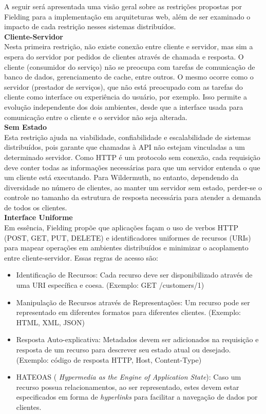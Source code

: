 A seguir será apresentada uma visão geral sobre as restrições propostas por Fielding para a implementação em arquiteturas web, além de ser examinado o impacto de cada restrição nesses sistemas distribuídos. \\

\textbf{Cliente-Servidor} \\

Nesta primeira restrição, não existe conexão entre cliente e servidor, mas sim a espera do servidor por pedidos de clientes através de chamada e resposta. O cliente (consumidor do serviço) não se preocupa com tarefas de comunicação de banco de dados, gerenciamento de cache, entre outros. O mesmo ocorre como o servidor (prestador de serviços), que não está preocupado com as tarefas do cliente como interface ou experiência do usuário, por exemplo. Isso permite a evolução independente dos dois ambientes, desde que a interface usada para comunicação entre o cliente e o servidor não seja alterada. \cite{Fielding2000} \\

\textbf{Sem Estado} \\

Esta restrição ajuda na viabilidade, confiabilidade e escalabilidade de sistemas distribuídos, pois garante que chamadas à API não estejam vinculadas a um determinado servidor. Como HTTP é um protocolo sem conexão, cada requisição deve conter todas as informações necessárias para que um servidor entenda o que um cliente está executando. Para Wildermuth, no entanto, dependendo da diversidade no número de clientes, ao manter um servidor sem estado, perder-se o controle no tamanho da estrutura de resposta necessária para atender a demanda de todos os clientes. \cite{Wildermuth2015} \\

\textbf{Interface Uniforme} \\

Em essência, Fielding propõe que aplicações façam o uso de verbos HTTP (POST, GET, PUT, DELETE) e identificadores uniformes de recursos (URIs) para mapear operações em ambientes distribuídos e minimizar o acoplamento entre cliente-servidor. Essas regras de acesso são: \cite{Fielding2000}

\begin{itemize}[noitemsep]
\item Identificação de Recursos: Cada recurso deve ser disponibilizado através de uma URI específica e coesa. (Exemplo: GET /customers/1)
\item Manipulação de Recursos através de Representações: Um recurso pode ser representado em diferentes formatos para diferentes clientes. (Exemplo: HTML, XML, JSON)
\item Resposta Auto-explicativa: Metadados devem ser adicionados na requisição e resposta de um recurso para descrever seu estado atual ou desejado. (Exemplo: código de resposta HTTP, Host, Content-Type)
\item HATEOAS (
 \textit{Hypermedia as the Engine of Application State}): Caso um recurso possua relacionamentos, ao ser representado, estes devem estar especificados em forma de \textit{hyperlinks} para facilitar a navegação de dados por clientes.
\end{itemize}

